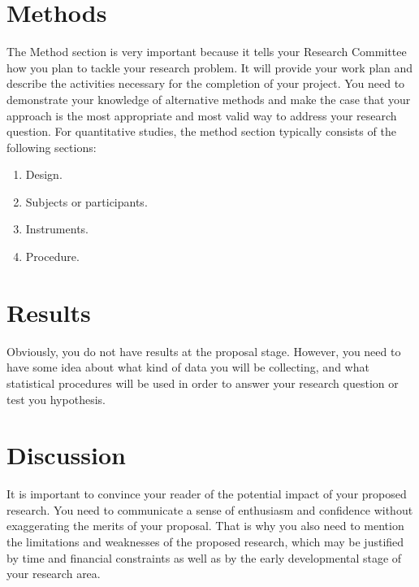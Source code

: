 \documentclass[a4paper, 12pt]{article}
\begin{document}
\section{Methods}
The Method section is very important because it tells your Research Committee how
you plan to tackle your research problem. It will provide your work plan and describe
the activities necessary for the completion of your project.
You need to demonstrate your knowledge of alternative methods and make the case
that your approach is the most appropriate and most valid way to address your
research question. \newline
For quantitative studies, the method section typically consists of the following
sections:
\begin{enumerate}
	\item Design.
	\item Subjects or participants.
	\item Instruments.
	\item Procedure.

\end{enumerate}

\section{Results}
Obviously, you do not have results at the proposal stage. However, you need to have
some idea about what kind of data you will be collecting, and what statistical
procedures will be used in order to answer your research question or test you
hypothesis.
\section{Discussion}
It is important to convince your reader of the potential impact of your proposed
research. You need to communicate a sense of enthusiasm and confidence without
exaggerating the merits of your proposal. That is why you also need to mention the
limitations and weaknesses of the proposed research, which may be justified by time
and financial constraints as well as by the early developmental stage of your
research area.
\end{document}
